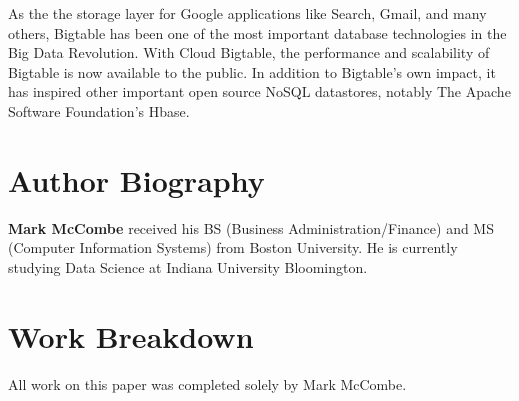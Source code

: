 \documentclass[9pt,twocolumn,twoside]{styles/osajnl}
\begin{document}
As the the storage layer for Google applications like Search, Gmail, and many others, Bigtable has been one of the most important database technologies in the Big Data Revolution. With Cloud Bigtable, the performance and scalability of Bigtable is now available to the public.  In addition to Bigtable's own impact, it has inspired other important open source NoSQL datastores, notably The Apache Software Foundation's Hbase.



 
\section*{Author Biography}
\begingroup
\setlength\intextsep{0pt}
\begin{minipage}[t][3.2cm][t]{1.0\columnwidth} %
  \noindent
  {\bfseries Mark McCombe} received his BS (Business Administration/Finance) and MS (Computer Information Systems) from Boston University.  He is currently studying Data Science at Indiana University Bloomington.
\end{minipage}
\endgroup

\newpage

\appendix

\section{Work Breakdown}

All work on this paper was completed solely by Mark McCombe.
\end{document}
